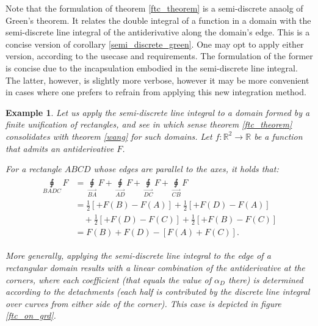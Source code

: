 \documentclass[11pt]{book}
\newtheorem{exm}[thm]{Example}
\begin{document}
\begin{remark}Note that the formulation of theorem \ref{ftc_theorem} is a semi-discrete
anaolg of Green's theorem. It relates the double integral of a function
in a domain with the semi-discrete line integral of the antiderivative
along the domain's edge. This is a concise version of corollary \ref{semi_discrete_green}.
One may opt to apply either version, according to the usecase and
requirements. The formulation of the former is concise due to the
incapsulation embodied in the semi-discrete line integral. The latter,
however, is slightly more verbose, however it may be more convenient
in cases where one prefers to refrain from applying this new integration
method.
\end{remark}

\begin{exm}Let us apply the semi-discrete line integral to a domain
formed by a finite unification of rectangles, and see in which sense
theorem \ref{ftc_theorem} consolidates with theorem \ref{wang} for such
domains. Let $f:\mathbb{R}^{2}\rightarrow\mathbb{R}$ be a function
that admits an antiderivative $F$.

For a rectangle $ABCD$ whose edges are parallel to the axes, it holds
that:
\begin{align}
\begin{aligned}
\underset{BADC}{\sqint}F & =\underset{\overrightarrow{BA}}{\sqint}F+\underset{\overrightarrow{AD}}{\sqint}F+\underset{\overrightarrow{DC}}{\sqint}F+\underset{\overrightarrow{CB}}{\sqint}F\\
 & =\frac{1}{2}\left[+F\left(B\right)-F\left(A\right)\right]+\frac{1}{2}\left[+F\left(D\right)-F\left(A\right)\right]\\
 & \quad+\frac{1}{2}\left[+F\left(D\right)-F\left(C\right)\right]+\frac{1}{2}\left[+F\left(B\right)-F\left(C\right)\right]\\
 & =F\left(B\right)+F\left(D\right)-\left[F\left(A\right)+F\left(C\right)\right].
\end{aligned}
\end{align}

More generally, applying the semi-discrete line integral to the edge
of a rectangular domain results with a linear combination of the antiderivative
at the corners, where each coefficient (that equals the value of $\alpha_{D}$
there) is determined according to the detachments (each half is contributed
by the discrete line integral over curves from either side of the
corner). This case is depicted in figure \ref{ftc_on_grd}.
\end{exm}
\end{document}
